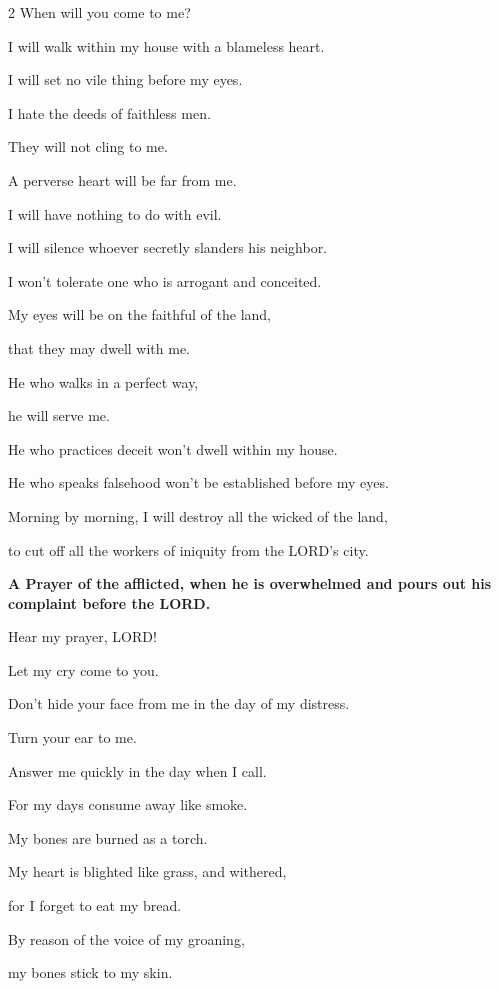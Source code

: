 \begin{multicols}{2}
	When will you come to me?
	
	I will walk within my house with a blameless heart.
	
	
	\myverse{}I will set no vile thing before my eyes.
	
	I hate the deeds of faithless men.
	
	They will not cling to me.
	
	
	\myverse{}A perverse heart will be far from me.
	
	I will have nothing to do with evil.
	
	
	\myverse{}I will silence whoever secretly slanders his neighbor.
	
	I won’t tolerate one who is arrogant and conceited.
	
	
	\myverse{}My eyes will be on the faithful of the land,
	
	that they may dwell with me.
	
	He who walks in a perfect way,
	
	he will serve me.
	
	
	\myverse{}He who practices deceit won’t dwell within my house.
	
	He who speaks falsehood won’t be established before my eyes.
	
	
	\myverse{}Morning by morning, I will destroy all the wicked of the land,
	
	to cut off all the workers of iniquity from the LORD’s city.
	
	
	\mychapter{}\textbf{A Prayer of the afflicted, when he is overwhelmed and pours out his complaint before the
		LORD.}
	
 \myverse*{}Hear my prayer, LORD!
	
	Let my cry come to you.
	
	
	\myverse{}Don’t hide your face from me in the day of my distress.
	
	Turn your ear to me.
	
	Answer me quickly in the day when I call.
	
	
	\myverse{}For my days consume away like smoke.
	
	My bones are burned as a torch.
	
	
	\myverse{}My heart is blighted like grass, and withered,
	
	for I forget to eat my bread.
	
	
	\myverse{}By reason of the voice of my groaning,
	
	my bones stick to my skin.
	

\end{multicols}
